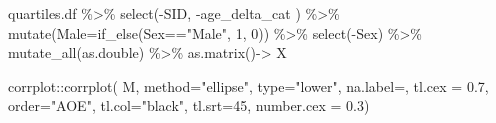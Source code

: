 \documentclass[
]{article}
\newenvironment{Shaded}{\begin{snugshade}}{\end{snugshade}}
\newcommand{\AttributeTok}[1]{\textcolor[rgb]{0.77,0.63,0.00}{#1}}
\newcommand{\DecValTok}[1]{\textcolor[rgb]{0.00,0.00,0.81}{#1}}
\newcommand{\FloatTok}[1]{\textcolor[rgb]{0.00,0.00,0.81}{#1}}
\newcommand{\FunctionTok}[1]{\textcolor[rgb]{0.00,0.00,0.00}{#1}}
\newcommand{\NormalTok}[1]{#1}
\newcommand{\OtherTok}[1]{\textcolor[rgb]{0.56,0.35,0.01}{#1}}
\newcommand{\SpecialCharTok}[1]{\textcolor[rgb]{0.00,0.00,0.00}{#1}}
\newcommand{\StringTok}[1]{\textcolor[rgb]{0.31,0.60,0.02}{#1}}
\begin{document}
\begin{Shaded}
\begin{Highlighting}[]
\NormalTok{quartiles.df }\SpecialCharTok{\%\textgreater{}\%} 
  \FunctionTok{select}\NormalTok{(}\SpecialCharTok{{-}}\NormalTok{SID,}
         \SpecialCharTok{{-}}\NormalTok{age\_delta\_cat}
\NormalTok{         ) }\SpecialCharTok{\%\textgreater{}\%} 
  \FunctionTok{mutate}\NormalTok{(}\AttributeTok{Male=}\FunctionTok{if\_else}\NormalTok{(Sex}\SpecialCharTok{==}\StringTok{"Male"}\NormalTok{, }\DecValTok{1}\NormalTok{, }\DecValTok{0}\NormalTok{)) }\SpecialCharTok{\%\textgreater{}\%} 
  \FunctionTok{select}\NormalTok{(}\SpecialCharTok{{-}}\NormalTok{Sex) }\SpecialCharTok{\%\textgreater{}\%} 
  \FunctionTok{mutate\_all}\NormalTok{(as.double) }\SpecialCharTok{\%\textgreater{}\%} 
  \FunctionTok{as.matrix}\NormalTok{()}\OtherTok{{-}\textgreater{}}
\NormalTok{  X}
\end{Highlighting}
\end{Shaded}

\begin{Shaded}
\end{Shaded}

\begin{Shaded}
\begin{Highlighting}[]
\NormalTok{corrplot}\SpecialCharTok{::}\FunctionTok{corrplot}\NormalTok{( M,}
                   \AttributeTok{method=}\StringTok{"ellipse"}\NormalTok{,}
                   \AttributeTok{type=}\StringTok{"lower"}\NormalTok{,}
                   \AttributeTok{na.label=}\StringTok{\textquotesingle{}{-}\textquotesingle{}}\NormalTok{, }
                   \AttributeTok{tl.cex =} \FloatTok{0.7}\NormalTok{, }
                   \AttributeTok{order=}\StringTok{"AOE"}\NormalTok{,}
                   \AttributeTok{tl.col=}\StringTok{"black"}\NormalTok{,}
                   \AttributeTok{tl.srt=}\DecValTok{45}\NormalTok{,}
                   \AttributeTok{number.cex =} \FloatTok{0.3}\NormalTok{) }
\end{Highlighting}
\end{Shaded}
\end{document}
